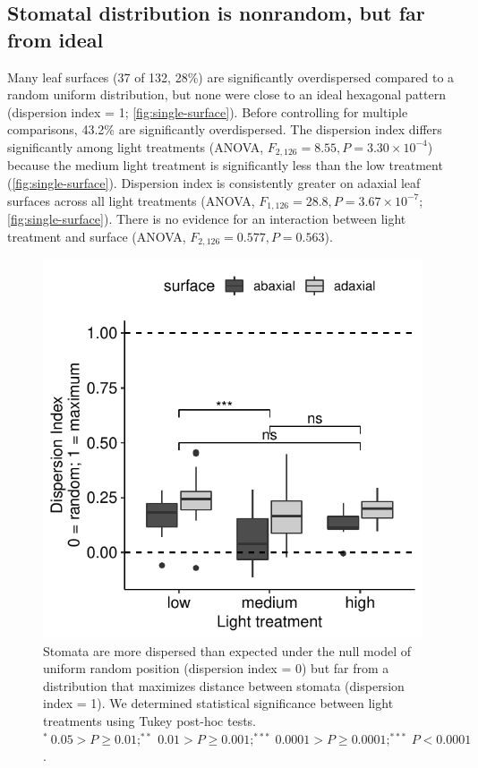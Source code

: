 \documentclass[12pt,halfline,a4paper,]{ouparticle}
\begin{document}
\hypertarget{stomatal-distribution-is-nonrandom-but-far-from-ideal}{%
\subsection{Stomatal distribution is nonrandom, but far from
ideal}\label{stomatal-distribution-is-nonrandom-but-far-from-ideal}}

Many leaf surfaces (37 of 132, 28\%) are significantly overdispersed
compared to a random uniform distribution, but none were close to an
ideal hexagonal pattern (dispersion index = 1;
\autoref{fig:single-surface}). Before controlling for multiple
comparisons, 43.2\% are significantly overdispersed. The dispersion
index differs significantly among light treatments (ANOVA,
\(F_{2,126} = 8.55, P = 3.30 \times 10^{-4}\)) because the medium light
treatment is significantly less than the low treatment
(\autoref{fig:single-surface}). Dispersion index is consistently greater
on adaxial leaf surfaces across all light treatments (ANOVA,
\(F_{1,126} = 28.8, P = 3.67 \times 10^{-7}\);
\autoref{fig:single-surface}). There is no evidence for an interaction
between light treatment and surface (ANOVA,
\(F_{2,126} = 0.577, P = 0.563\)).

\begin{figure}[ht]
\includegraphics[width=\textwidth]{figures/single-surface.pdf}
\caption{Stomata are more dispersed than expected under the null model of uniform random position (dispersion index = 0) but far from a distribution that maximizes distance between stomata (dispersion index = 1). We determined statistical significance between light treatments using Tukey post-hoc tests. $^*~0.05 > P \ge 0.01; ^{**}~0.01 > P \ge 0.001; ^{***}~0.0001 > P \ge 0.0001; ^{***}~ P <0.0001$.}
\label{fig:single-surface}
\end{figure}
\end{document}
